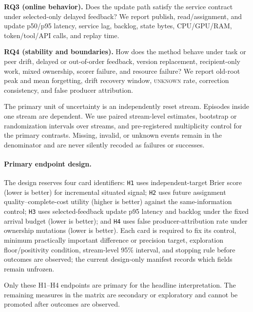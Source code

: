 \documentclass[sigconf,anonymous]{aamas}
\newcommand{\unknown}{\textsc{unknown}}
\begin{document}
\textbf{RQ3 (online behavior).} Does the update path satisfy the service contract under selected-only delayed feedback? We report publish, read/assignment, and update p50/p95 latency, service lag, backlog, state bytes, CPU/GPU/RAM, token/tool/API calls, and replay time.

\textbf{RQ4 (stability and boundaries).} How does the method behave under task or peer drift, delayed or out-of-order feedback, version replacement, recipient-only work, mixed ownership, scorer failure, and resource failure? We report old-root peak and mean forgetting, drift recovery window, \unknown{} rate, correction consistency, and false producer attribution.

The primary unit of uncertainty is an independently reset stream. Episodes inside one stream are dependent. We use paired stream-level estimates, bootstrap or randomization intervals over streams, and pre-registered multiplicity control for the primary contrasts. Missing, invalid, or unknown events remain in the denominator and are never silently recoded as failures or successes.

\paragraph{Primary endpoint design.} The design reserves four card identifiers: \texttt{H1} uses independent-target Brier score (lower is better) for incremental situated signal; \texttt{H2} uses future assignment quality--complete-cost utility (higher is better) against the same-information control; \texttt{H3} uses selected-feedback update p95 latency and backlog under the fixed arrival budget (lower is better); and \texttt{H4} uses false producer-attribution rate under ownership mutations (lower is better). Each card is required to fix its control, minimum practically important difference or precision target, exploration floor/positivity condition, stream-level 95\% interval, and stopping rule before outcomes are observed; the current design-only manifest records which fields remain unfrozen.

Only these H1--H4 endpoints are primary for the headline interpretation. The remaining measures in the matrix are secondary or exploratory and cannot be promoted after outcomes are observed.
\end{document}

